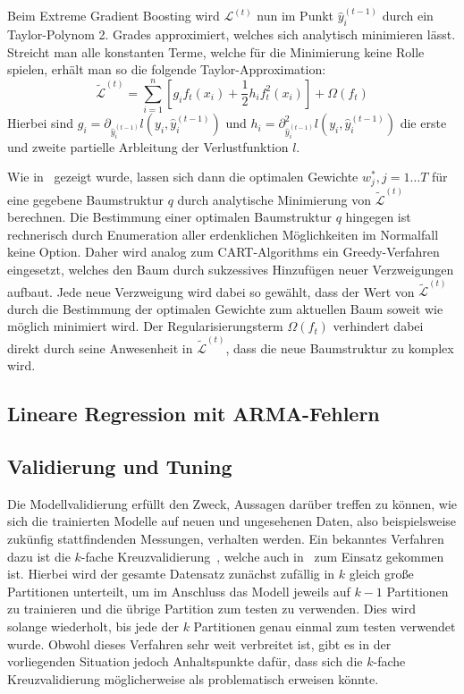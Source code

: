 Beim Extreme Gradient Boosting wird $\mathcal{L}^{(t)}$ nun im Punkt $\hat{y}^{(t-1)}_i$ durch ein Taylor-Polynom 2. Grades
approximiert, welches sich analytisch minimieren l\"asst.
Streicht man alle konstanten Terme, welche f\"ur die Minimierung keine Rolle spielen, erh\"alt man so die folgende Taylor-Approximation:
\begin{equation}
    \tilde{\mathcal{L}}^{(t)} = \sum_{i=1}^{n} \left[ g_i f_t(x_i) + \frac{1}{2}h_i f_t^2(x_i) \right] + \Omega(f_t)
\end{equation}
Hierbei sind $g_i = \partial_{\hat{y}_i^{(t-1)}} l(y_i, \hat{y}_i^{(t-1)})$ und 
$h_i = \partial_{\hat{y}_i^{(t-1)}}^2 l(y_i, \hat{y}_i^{(t-1)})$ die erste und zweite partielle Arbleitung der Verlustfunktion
$l$.

Wie in~\cite{XGBoost} gezeigt wurde, lassen sich dann die optimalen Gewichte $w_j^*, j=1 \ldots T$ f\"ur eine gegebene Baumstruktur
$q$ durch analytische Minimierung von $\tilde{\mathcal{L}}^{(t)}$ berechnen.
Die Bestimmung einer optimalen Baumstruktur $q$ hingegen ist rechnerisch durch Enumeration aller erdenklichen M\"oglichkeiten im
Normalfall keine Option.
Daher wird analog zum CART-Algorithms ein Greedy-Verfahren eingesetzt, welches den Baum durch sukzessives Hinzuf\"ugen neuer
Verzweigungen aufbaut.
Jede neue Verzweigung wird dabei so gew\"ahlt, dass der Wert von $\tilde{\mathcal{L}}^{(t)}$ durch die Bestimmung der optimalen
Gewichte zum aktuellen Baum soweit wie m\"oglich minimiert wird.
Der Regularisierungsterm $\Omega(f_t)$ verhindert dabei direkt durch seine Anwesenheit in $\tilde{\mathcal{L}}^{(t)}$, dass die neue
Baumstruktur zu komplex wird.

\subsection{Lineare Regression mit ARMA-Fehlern}
\label{sec:arma}

\subsection{Validierung und Tuning}

Die Modellvalidierung erf\"ullt den Zweck, Aussagen dar\"uber treffen zu k\"onnen, wie sich die trainierten Modelle
auf neuen und ungesehenen Daten, also beispielsweise zuk\"unfig stattfindenden Messungen, 
verhalten werden.
Ein bekanntes Verfahren dazu ist die $k$-fache Kreuzvalidierung~\cite{elements}, welche auch in~\cite{IEEE} zum Einsatz
gekommen ist.
Hierbei wird der gesamte Datensatz zun\"achst zuf\"allig in $k$ gleich gro{\ss}e Partitionen unterteilt,
um im Anschluss das Modell jeweils auf $k-1$ Partitionen
zu trainieren und die \"ubrige Partition zum testen zu verwenden. Dies wird solange wiederholt, bis jede der
$k$ Partitionen genau einmal zum testen verwendet wurde.
Obwohl dieses Verfahren sehr weit verbreitet ist, gibt es in der vorliegenden Situation jedoch Anhaltspunkte daf\"ur,
dass sich die $k$-fache Kreuzvalidierung m\"oglicherweise als problematisch erweisen k\"onnte.

